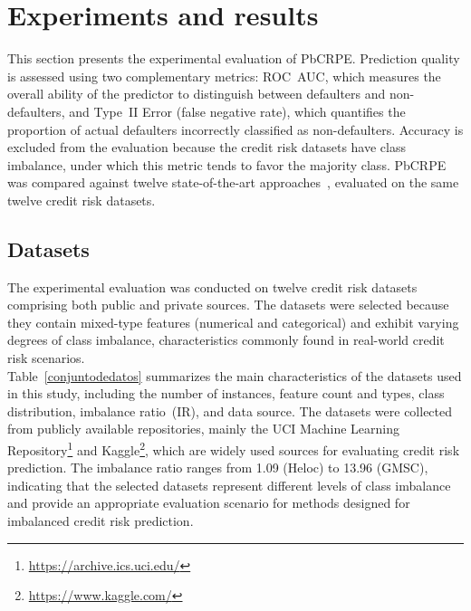 
{\color{blue}
	\section{Experiments and results }
	
	This section presents the experimental evaluation of PbCRPE. Prediction quality is assessed using two complementary metrics: ROC~AUC, which measures the overall ability of the predictor to distinguish between defaulters and
	non-defaulters, and Type~II Error (false negative rate), which quantifies the proportion of actual defaulters incorrectly classified as non-defaulters. Accuracy is excluded from the evaluation because the credit risk datasets have class imbalance, under which this metric tends to favor the majority class. PbCRPE was compared against twelve state-of-the-art approaches~\cite{aruleba2025effective, baisholan2025fraudx, damanik2025advanced, hartomo2025novel, wang2025two, han2024nate, sun2025enhancing, zhou2025enhancing, talaat2024toward, zheng2024micro, nguyen2025comparative, zandi2025attention}, evaluated on the same twelve credit risk datasets.
	
	\subsection{Datasets}
	
	The experimental evaluation was conducted on twelve credit risk datasets comprising both public and private sources. The datasets were selected because they contain mixed-type features (numerical and categorical) and exhibit varying degrees of class imbalance, characteristics commonly found in real-world credit risk scenarios.\\
	
	Table~\ref{conjuntodedatos} summarizes the main characteristics of the datasets used in this study, including the number of instances, feature count and types, class distribution, imbalance ratio~(IR), and data source. The datasets were collected from publicly available repositories, mainly the UCI Machine Learning Repository\footnote{\url{https://archive.ics.uci.edu/}} and Kaggle\footnote{\url{https://www.kaggle.com/}}, which are widely used sources for evaluating credit risk prediction. The imbalance ratio ranges from 1.09 (Heloc) to 13.96 (GMSC), indicating that the selected datasets represent different levels of class imbalance and provide an appropriate evaluation scenario for methods designed for imbalanced credit risk prediction.
	
}
